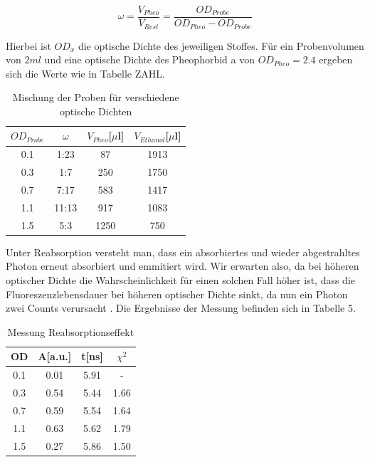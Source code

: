 \documentclass{article}
\begin{document}
\begin{equation}
  \omega = \frac{V_{Pheo}}{V_{Rest}}=\frac{OD_{Probe}}{OD_{Pheo}-OD_{Probe}}
\end{equation}



Hierbei ist $OD_x$ die optische Dichte des jeweiligen Stoffes. Für ein Probenvolumen von $2ml$ und eine
optische Dichte des Pheophorbid a von $OD_{Pheo}=2.4$ ergeben sich die Werte wie in Tabelle ZAHL.

\begin{table}[h]
  \centering
  \begin{tabular}{c|c|c|c}
    $OD_{Probe}$ & $\omega$ & $V_{Pheo}$[$\mu$l] & $V_{Ethanol}$[$\mu$l] \\
    \hline
    0.1          &  1:23  & 87                & 1913 \\
    0.3          &  1:7   & 250               & 1750 \\
    0.7          &  7:17  & 583               & 1417 \\
    1.1          &  11:13 & 917               & 1083 \\
    1.5          &  5:3   & 1250              & 750  \\
  \end{tabular}
  \caption{Mischung der Proben für verschiedene optische Dichten}
\end{table}



Unter Reabsorption versteht man, dass ein absorbiertes und wieder abgestrahltes Photon erneut absorbiert und emmitiert wird.
Wir erwarten also, da bei höheren optischer Dichte die Wahrscheinlichkeit für einen solchen Fall höher ist, dass die Fluoreszenzlebensdauer
bei höheren optischer Dichte sinkt, da nun ein Photon zwei Counts verursacht . Die Ergebnisse der Messung befinden sich in Tabelle 5.


\begin{table}[h]
  \centering
  \begin{tabular}{c|c|c|c}
    OD           & A[a.u.]& t[ns]             & $\chi^2$\\
    \hline
    0.1          &  0.01  & 5.91              & -  \\
    0.3          &  0.54  & 5.44              & 1.66  \\
    0.7          &  0.59  & 5.54              & 1.64  \\
    1.1          &  0.63  & 5.62              & 1.79  \\
    1.5          &  0.27  & 5.86              & 1.50   \\
  \end{tabular}
  \caption{Messung Reabsorptionseffekt}
\end{table}
\end{document}
